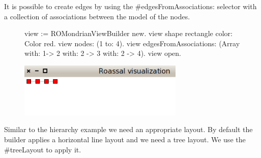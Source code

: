 \documentclass[a4paper,10pt,twoside]{book}
\begin{document}


It is possible to create edges by using the \#edgesFromAssociations: selector with a collection of associations between the model of the nodes.

\begin{figure}[H]
      \begin{minipage}[t]{1\textwidth}
      \vspace{0pt}
\begin{code}{}
view := ROMondrianViewBuilder new.
view shape rectangle 
	color: Color red.
view nodes: (1 to: 4).
view 
	edgesFromAssociations: (Array with: 1-> 2 with: 2 -> 3 with: 2 -> 4).
view open.
\end{code}
   \end{minipage}
   \hfill
   \begin{minipage}[t]{1\textwidth}
	 \vspace{0pt} \raggedright
       \centering
		\includegraphics[width=0.7\textwidth]{mondrian5}
   \end{minipage}
\label{fig:mondrian5}
\end{figure} 



Similar to the  hierarchy example we need an appropriate layout. By default the builder applies a horizontal line layout and we need a tree layout. We use the \#treeLayout to apply it.
\end{document}
